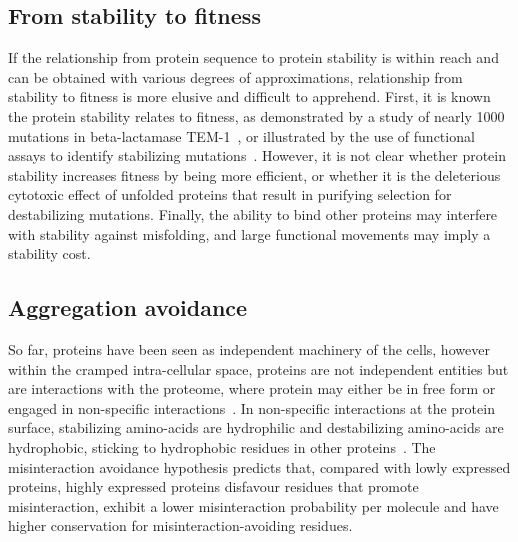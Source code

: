 

\subsection{From stability to fitness}
If the relationship from protein sequence to protein stability is within reach and can be obtained with various degrees of approximations, relationship from stability to fitness is more elusive and difficult to apprehend.
First, it is known the protein stability relates to fitness, as demonstrated by a study of nearly 1000 mutations in beta-lactamase TEM-1~\citep{Jacquier2013}, or illustrated by the use of functional assays to identify stabilizing mutations~\citep{Araya2012}.
However, it is not clear whether protein stability increases fitness by being more efficient, or whether it is the deleterious cytotoxic effect of unfolded proteins that result in purifying selection for destabilizing mutations.
Finally, the ability to bind other proteins may interfere with stability against misfolding, and large functional movements may imply a stability cost.

\subsection{Aggregation avoidance}

So far, proteins have been seen as independent machinery of the cells, however within the cramped intra-cellular space, proteins are not independent entities but are interactions with the proteome, where protein may either be in free form or engaged in non-specific interactions~\citep{Yang2012, Zhang2013}.
In non-specific interactions at the protein surface, stabilizing amino-acids are hydrophilic and destabilizing amino-acids are hydrophobic, sticking to hydrophobic residues in other proteins~\citep{Dixit2013,Manhart2015}.
The misinteraction avoidance hypothesis predicts that, compared with lowly expressed proteins, highly expressed proteins disfavour residues that promote misinteraction, exhibit a lower misinteraction probability per molecule and have higher conservation for misinteraction-avoiding residues.


